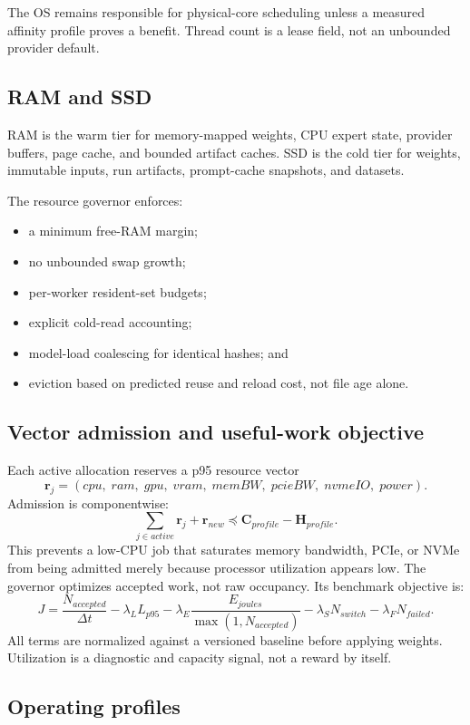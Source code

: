 \documentclass[11pt,letterpaper]{article}
\begin{document}
The OS remains responsible for physical-core scheduling unless a measured
affinity profile proves a benefit. Thread count is a lease field, not an
unbounded provider default.

\subsection{RAM and SSD}

RAM is the warm tier for memory-mapped weights, CPU expert state, provider
buffers, page cache, and bounded artifact caches. SSD is the cold tier for
weights, immutable inputs, run artifacts, prompt-cache snapshots, and datasets.

The resource governor enforces:

\begin{itemize}
  \item a minimum free-RAM margin;
  \item no unbounded swap growth;
  \item per-worker resident-set budgets;
  \item explicit cold-read accounting;
  \item model-load coalescing for identical hashes; and
  \item eviction based on predicted reuse and reload cost, not file age alone.
\end{itemize}

\subsection{Vector admission and useful-work objective}

Each active allocation reserves a p95 resource vector
\[
\mathbf{r}_j =
(cpu,\;ram,\;gpu,\;vram,\;memBW,\;pcieBW,\;nvmeIO,\;power).
\]
Admission is componentwise:
\[
\sum_{j\in active}\mathbf{r}_j+\mathbf{r}_{new}
\preceq \mathbf{C}_{profile}-\mathbf{H}_{profile}.
\]
This prevents a low-CPU job that saturates memory bandwidth, PCIe, or NVMe from
being admitted merely because processor utilization appears low. The governor
optimizes accepted work, not raw occupancy. Its benchmark objective is:
\[
J =
\frac{N_{accepted}}{\Delta t}
-\lambda_L L_{p95}
-\lambda_E\frac{E_{joules}}{\max(1,N_{accepted})}
-\lambda_S N_{switch}
-\lambda_F N_{failed}.
\]
All terms are normalized against a versioned baseline before applying weights.
Utilization is a diagnostic and capacity signal, not a reward by itself.

\subsection{Operating profiles}
\end{document}
